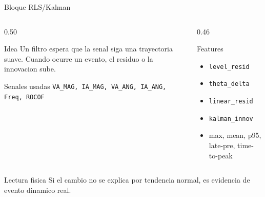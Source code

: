 \documentclass[10pt,aspectratio=169]{beamer}
\newcommand{\code}[1]{\texttt{\footnotesize #1}}
\begin{document}
\begin{frame}{Bloque RLS/Kalman}
\small
\begin{columns}[T,totalwidth=\textwidth]
\begin{column}{0.50\textwidth}
\begin{block}{Idea}
Un filtro espera que la senal siga una trayectoria suave. Cuando ocurre un evento, el residuo o la innovacion sube.
\end{block}
\begin{block}{Senales usadas}
\code{VA\_MAG, IA\_MAG, VA\_ANG, IA\_ANG, Freq, ROCOF}
\end{block}
\end{column}
\begin{column}{0.46\textwidth}
\begin{block}{Features}
\begin{itemize}
  \item \code{level\_resid}
  \item \code{theta\_delta}
  \item \code{linear\_resid}
  \item \code{kalman\_innov}
  \item max, mean, p95, late-pre, time-to-peak
\end{itemize}
\end{block}
\end{column}
\end{columns}
\vspace{2mm}
\begin{exampleblock}{Lectura fisica}
Si el cambio no se explica por tendencia normal, es evidencia de evento dinamico real.
\end{exampleblock}
\end{frame}
\end{document}

